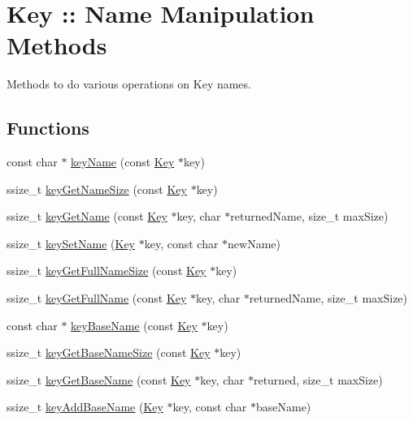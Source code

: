 \hypertarget{group__keyname}{
\section{Key :: Name Manipulation Methods}
\label{group__keyname}
}


Methods to do various operations on Key names.  


\subsection*{Functions}
\begin{DoxyCompactItemize}
\item 
const char $\ast$ \hyperlink{group__keyname_ga8e805c726a60da921d3736cda7813513}{keyName} (const \hyperlink{struct__Key}{Key} $\ast$key)
\item 
ssize\_\-t \hyperlink{group__keyname_gabdbcfa51ed8a387e47ead207affa2d2e}{keyGetNameSize} (const \hyperlink{struct__Key}{Key} $\ast$key)
\item 
ssize\_\-t \hyperlink{group__keyname_gab29a850168d9b31c9529e90cf9ab68be}{keyGetName} (const \hyperlink{struct__Key}{Key} $\ast$key, char $\ast$returnedName, size\_\-t maxSize)
\item 
ssize\_\-t \hyperlink{group__keyname_ga7699091610e7f3f43d2949514a4b35d9}{keySetName} (\hyperlink{struct__Key}{Key} $\ast$key, const char $\ast$newName)
\item 
ssize\_\-t \hyperlink{group__keyname_gab65dc9d43d3ee08d5e936a20ebbddd23}{keyGetFullNameSize} (const \hyperlink{struct__Key}{Key} $\ast$key)
\item 
ssize\_\-t \hyperlink{group__keyname_gaaba1494a5ffc976e0e56c43f4334a23c}{keyGetFullName} (const \hyperlink{struct__Key}{Key} $\ast$key, char $\ast$returnedName, size\_\-t maxSize)
\item 
const char $\ast$ \hyperlink{group__keyname_gaaff35e7ca8af5560c47e662ceb9465f5}{keyBaseName} (const \hyperlink{struct__Key}{Key} $\ast$key)
\item 
ssize\_\-t \hyperlink{group__keyname_ga1a0b76c5d9e5367c7e72211e6c63d43a}{keyGetBaseNameSize} (const \hyperlink{struct__Key}{Key} $\ast$key)
\item 
ssize\_\-t \hyperlink{group__keyname_ga0992d26bcfca767cb8e77053a483eb64}{keyGetBaseName} (const \hyperlink{struct__Key}{Key} $\ast$key, char $\ast$returned, size\_\-t maxSize)
\item 
ssize\_\-t \hyperlink{group__keyname_gaa942091fc4bd5c2699e49ddc50829524}{keyAddBaseName} (\hyperlink{struct__Key}{Key} $\ast$key, const char $\ast$baseName)

\end{DoxyCompactItemize}
